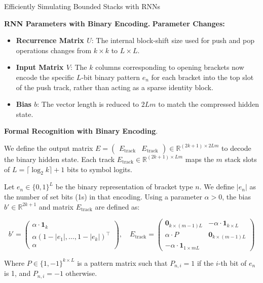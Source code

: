 \begin{question}{Efficiently Simulating Bounded Stacks with RNNs}
\begin{subquestion}{\textbf{RNN Parameters with Binary Encoding.}}
\textbf{Parameter Changes:}
\begin{itemize}
    \item \textbf{Recurrence Matrix $U$}: The internal block-shift size used for push and pop operations  changes from $k \times k$ to $L \times L$.
    \item \textbf{Input Matrix $V$}: The $k$ columns corresponding to opening brackets now encode the specific $L$-bit binary pattern $e_n$ for each bracket into the top slot of the push track, rather than acting as a sparse identity block.
    \item \textbf{Bias $b$}: The vector length is reduced to $2Lm$ to match the compressed hidden state.
\end{itemize}

\end{subquestion}

\begin{subquestion}{\textbf{Formal Recognition with Binary Encoding}.}

We define the output matrix $E = \begin{pmatrix} E_{\text{track}} & E_{\text{track}} \end{pmatrix} \in \mathbb{R}^{(2k+1) \times 2Lm}$ to decode the binary hidden state. Each track $E_{\text{track}} \in \mathbb{R}^{(2k+1) \times Lm}$ maps the $m$ stack slots of $L = \lceil \log_2 k \rceil + 1$ bits to symbol logits.

Let $e_n \in \{0, 1\}^L$ be the binary representation of bracket type $n$. We define $|e_n|$ as the number of set bits (1s) in that encoding. Using a parameter $\alpha > 0$, the bias $b' \in \mathbb{R}^{2k+1}$ and matrix $E_{\text{track}}$ are defined as:

\[
b' = \begin{pmatrix} 
\alpha \cdot \mathbf{1}_k \\ 
\alpha(1 - |e_1|, \dots, 1 - |e_k|)^\top \\ 
\alpha 
\end{pmatrix}, \quad 
E_{\text{track}} = \begin{pmatrix} 
\mathbf{0}_{k \times (m-1)L} & -\alpha \cdot \mathbf{1}_{k \times L} \\
\alpha \cdot P & \mathbf{0}_{k \times (m-1)L} \\
-\alpha \cdot \mathbf{1}_{1 \times mL}
\end{pmatrix}
\]

Where $P \in \{1, -1\}^{k \times L}$ is a pattern matrix such that $P_{n,i} = 1$ if the $i$-th bit of $e_n$ is 1, and $P_{n,i} = -1$ otherwise.


\end{subquestion}
\end{question}
